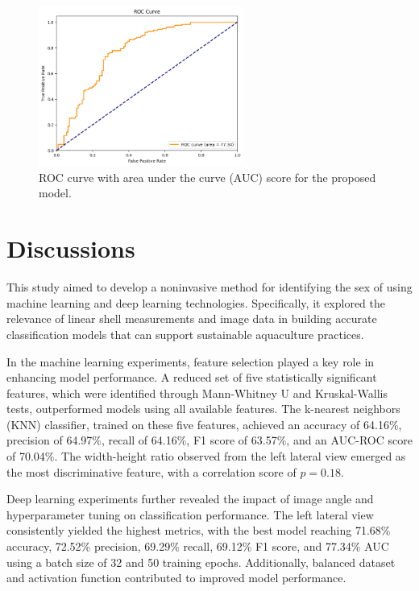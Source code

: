 \begin{figure}[!htbp]
	\centering
	\includegraphics[width=0.6\textwidth]{figures/roc.png}
	\caption{ROC curve with area under the curve (AUC) score for the proposed model.}
	\label{fig:roc_auc}
\end{figure}

\newpage

\section{Discussions}

This study aimed to develop a noninvasive method for identifying the sex of \Tgranosa using machine learning and deep learning technologies. Specifically, it explored the relevance of linear shell measurements and image data in building accurate classification models that can support sustainable aquaculture practices.

In the machine learning experiments, feature selection played a key role in enhancing model performance. A reduced set of five statistically significant features, which were identified through Mann-Whitney U and Kruskal-Wallis tests, outperformed models using all available features. The k-nearest neighbors (KNN) classifier, trained on these five features, achieved an accuracy of 64.16\%, precision of 64.97\%, recall of 64.16\%, F1 score of 63.57\%, and an AUC-ROC score of 70.04\%. The width-height ratio observed from the left lateral view emerged as the most discriminative feature, with a correlation score of $p = 0.18$.

Deep learning experiments further revealed the impact of image angle and hyperparameter tuning on classification performance. The left lateral view consistently yielded the highest metrics, with the best model reaching 71.68\% accuracy, 72.52\% precision, 69.29\% recall, 69.12\% F1 score, and 77.34\% AUC using a batch size of 32 and 50 training epochs. Additionally, balanced dataset and activation function contributed to improved model performance.

